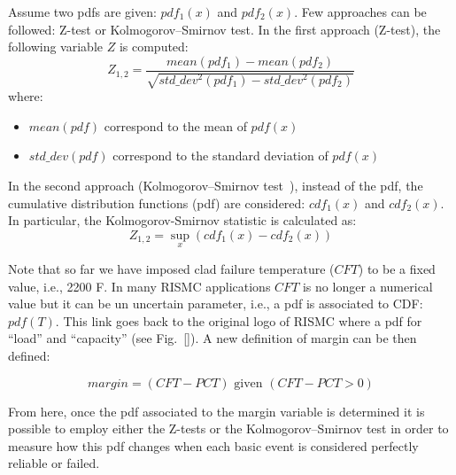 Assume two pdfs are given: $pdf_1(x)$ and $pdf_2(x)$. Few approaches can be followed: Z-test or 
Kolmogorov–Smirnov test. 
In the first approach (Z-test), the following variable $Z$ is computed:
\begin{equation}
  Z_{1,2} = \frac{mean(pdf_1)-mean(pdf_2)}{\sqrt{std\_dev^2 (pdf_1)-std\_dev^2(pdf_2)}} 
  \label{eq:Ztest}
\end{equation}
where:
\begin{itemize}
  \item $mean(pdf)$ correspond to the mean of $pdf(x)$ 
  \item $std\_dev(pdf)$ correspond to the standard deviation of $pdf(x)$ 
\end{itemize}

In the second approach (Kolmogorov–Smirnov test~\cite{}), instead of the pdf, the cumulative 
distribution functions (pdf) are considered: $cdf_1(x)$ and $cdf_2(x)$. 
In particular, the Kolmogorov-Smirnov statistic is calculated as:
\begin{equation}
  Z_{1,2} = \sup_{x} (cdf_1(x) - cdf_2(x))
  \label{eq:Kolmogorov-Smirnov}
\end{equation}

Note that so far we have imposed clad failure temperature ($CFT$) to be a fixed value, 
i.e., 2200 F. 
In many RISMC applications $CFT$ is no longer a numerical value but it can be un uncertain 
parameter, i.e., a pdf is associated to CDF: $pdf(T)$. 
This link goes back to the original logo of RISMC where a pdf for ``load'' and ``capacity'' 
(see Fig.~\ref{}).
A new definition of margin can be then defined:

\begin{equation}
  margin=(CFT-PCT) \text{ given } (CFT-PCT>0)
  \label{eq:new margin}
\end{equation}

From here, once the pdf associated to the margin variable is determined it is possible 
to employ either the Z-tests or the Kolmogorov–Smirnov test in order to measure how this pdf 
changes when each basic event is considered perfectly reliable or failed. 
